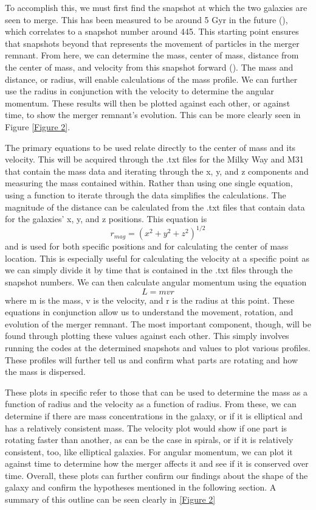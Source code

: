 \documentclass[twocolumn]{aastex631}
\begin{document}
To accomplish this, we must first find the snapshot at which the two galaxies are seen to merge. This has been measured to be around 5 Gyr in the future (\cite{Cox_2008}), which correlates to a snapshot number around 445. This starting point ensures that snapshots beyond that represents the movement of particles in the merger remnant. From here, we can determine the mass, center of mass, distance from the center of mass, and velocity from this snapshot forward (\cite{}). The mass and distance, or radius, will enable calculations of the mass profile. We can further use the radius in conjunction with the velocity to determine the angular momentum. These results will then be plotted against each other, or against time, to show the merger remnant's evolution. This can be more clearly seen in Figure \ref{Figure 2}. 

The primary equations to be used relate directly to the center of mass and its velocity. This will be acquired through the .txt files for the Milky Way and M31 that contain the mass data and iterating through the x, y, and z components and measuring the mass contained within. Rather than using one single equation, using a function to iterate through the data simplifies the calculations. The magnitude of the distance can be calculated from the .txt files that contain data for the galaxies' x, y, and z positions. This equation is $$ r_{mag} = (x^2 + y^2 + z^2)^{1/2}$$ and is used for both specific positions and for calculating the center of mass location. This is especially useful for calculating the velocity at a specific point as we can simply divide it by time that is contained in the .txt files through the snapshot numbers. We can then calculate angular momentum using the equation $$L = mvr$$ where m is the mass, v is the velocity, and r is the radius at this point. These equations in conjunction allow us to understand the movement, rotation, and evolution of the merger remnant. The most important component, though, will be found through plotting these values against each other. This simply involves running the codes at the determined snapshots and values to plot various profiles. These profiles will further tell us and confirm what parts are rotating and how the mass is dispersed. 

These plots in specific refer to those that can be used to determine the mass as a function of radius and the velocity as a function of radius. From these, we can determine if there are mass concentrations in the galaxy, or if it is elliptical and has a relatively consistent mass. The velocity plot would show if one part is rotating faster than another, as can be the case in spirals, or if it is relatively consistent, too, like elliptical galaxies. For angular momentum, we can plot it against time to determine how the merger affects it and see if it is conserved over time. 
Overall, these plots can further confirm our findings about the shape of the galaxy and confirm the hypotheses mentioned in the following section.
A summary of this outline can be seen clearly in \ref{Figure 2}
\end{document}
